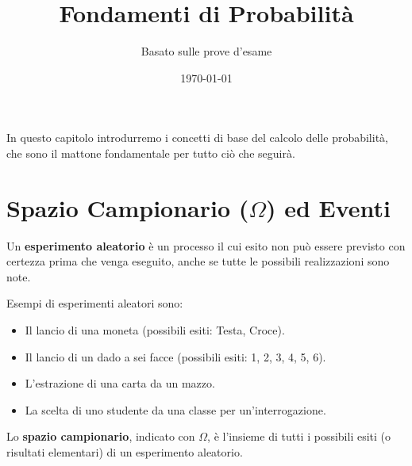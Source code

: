 

\title{Fondamenti di Probabilità}
\author{Basato sulle prove d'esame}
\date{\today}



\maketitle
\tableofcontents
\newpage

\label{cap:fondamenti}
In questo capitolo introdurremo i concetti di base del calcolo delle probabilità, che sono il mattone fondamentale per tutto ciò che seguirà.

\section{Spazio Campionario (\texorpdfstring{$\Omega$}{Omega}) ed Eventi}

\begin{definition}
Un \textbf{esperimento aleatorio} è un processo il cui esito non può essere previsto con certezza prima che venga eseguito, anche se tutte le possibili realizzazioni sono note.
\end{definition}

\begin{example}
Esempi di esperimenti aleatori sono:
\begin{itemize}
    \item Il lancio di una moneta (possibili esiti: Testa, Croce).
    \item Il lancio di un dado a sei facce (possibili esiti: 1, 2, 3, 4, 5, 6).
    \item L'estrazione di una carta da un mazzo.
    \item La scelta di uno studente da una classe per un'interrogazione.
\end{itemize}
\end{example}

\begin{definition}
Lo \textbf{spazio campionario}, indicato con $\Omega$, è l'insieme di tutti i possibili esiti (o risultati elementari) di un esperimento aleatorio.
\end{definition}

